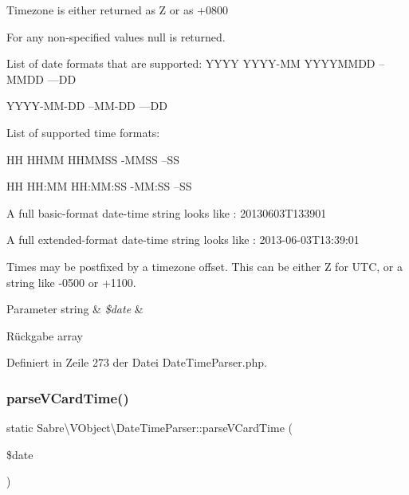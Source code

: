 Timezone is either returned as \textquotesingle{}Z\textquotesingle{} or as \textquotesingle{}+0800\textquotesingle{}

For any non-\/specified values null is returned.

List of date formats that are supported\+: Y\+Y\+YY Y\+Y\+Y\+Y-\/\+MM Y\+Y\+Y\+Y\+M\+M\+DD --M\+M\+DD ---DD

Y\+Y\+Y\+Y-\/\+M\+M-\/\+DD --M\+M-\/\+DD ---DD

List of supported time formats\+:

HH H\+H\+MM H\+H\+M\+M\+SS -\/\+M\+M\+SS --SS

HH HH\+:MM H\+H\+:\+MM\+:SS -\/\+MM\+:SS --SS

A full basic-\/format date-\/time string looks like \+: 20130603\+T133901

A full extended-\/format date-\/time string looks like \+: 2013-\/06-\/03\+T13\+:39\+:01

Times may be postfixed by a timezone offset. This can be either \textquotesingle{}Z\textquotesingle{} for U\+TC, or a string like -\/0500 or +1100.


\begin{DoxyParams}[1]{Parameter}
string & {\em \$date} & \\
\hline
\end{DoxyParams}
\begin{DoxyReturn}{Rückgabe}
array 
\end{DoxyReturn}


Definiert in Zeile 273 der Datei Date\+Time\+Parser.\+php.

\mbox{\label{class_sabre_1_1_v_object_1_1_date_time_parser_ab54a3f395455e9bb9b4ab1487a8b06e5}} 
\subsubsection{\texorpdfstring{parse\+V\+Card\+Time()}{parseVCardTime()}}
{\footnotesize\ttfamily static Sabre\textbackslash{}\+V\+Object\textbackslash{}\+Date\+Time\+Parser\+::parse\+V\+Card\+Time (\begin{DoxyParamCaption}\item[{}]{\$date }\end{DoxyParamCaption})\hspace{0.3cm}{\ttfamily [static]}}

